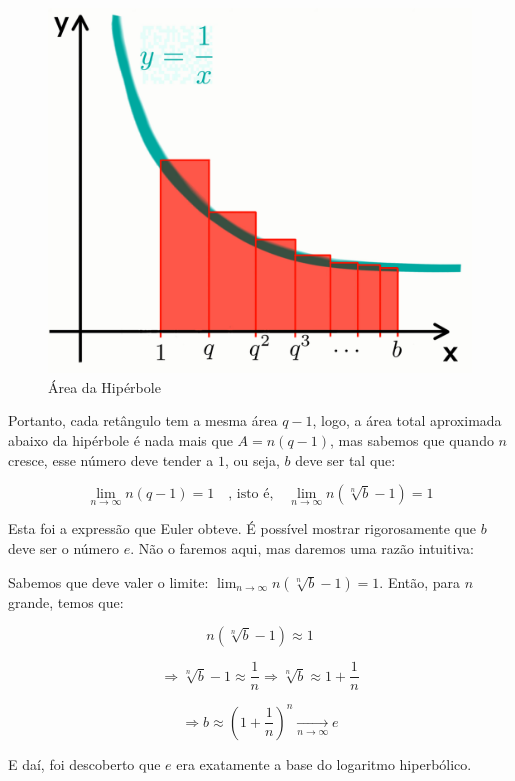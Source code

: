 \begin{figure}[H]
    \centering
    \includegraphics[width=0.5\linewidth]{img/eulerNatural.png}
    \caption{Área da Hipérbole}
    \label{fig:hiperboleeuler}
\end{figure}

Portanto, cada retângulo tem a mesma área $q - 1$, logo, a área total aproximada abaixo da hipérbole é nada mais que $A = n(q-1)$, mas sabemos que quando $n$ cresce, esse número deve tender a $1$, ou seja, $b$ deve ser tal que:

\[
    \lim_{n \to \infty} n(q - 1) = 1 \quad \text{, isto é,} \quad \lim_{n \to \infty} n(\sqrt[n]{b} - 1) = 1
\]

Esta foi a expressão que Euler obteve. É possível mostrar rigorosamente que $b$ deve ser o número $e$. Não o faremos aqui, mas daremos uma razão intuitiva:

Sabemos que deve valer o limite: $\lim_{n \to \infty} n(\sqrt[n]{b} - 1) = 1$. Então, para $n$ grande, temos que:

\[
n \left( \sqrt[n]{b} - 1 \right) \approx 1
\]

\[
\Rightarrow \sqrt[n]{b} - 1 \approx \frac{1}{n} 
\Rightarrow \sqrt[n]{b} \approx 1 + \frac{1}{n}
\]

\[
\Rightarrow b \approx \left( 1 + \frac{1}{n} \right)^n 
\xrightarrow[n \to \infty]{} e
\]

E daí, foi descoberto que $e$ era exatamente a base do logaritmo hiperbólico.